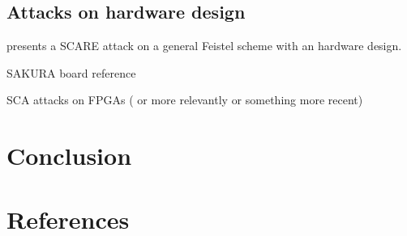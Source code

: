 \documentclass[11pt]{sdm}
\begin{document}
\subsection{Attacks on hardware design}

\cite{Réal_Dubois_Guilloux_Valette_Drissi_2008} presents a SCARE attack on a general Feistel scheme with an hardware design.

SAKURA board reference

SCA attacks on FPGAs (\cite{Peeters_Standaert_Donckers_Quisquater_2005} or more relevantly \cite{Standaert_Ors_Preneel_2004} or something more recent)

\section{Conclusion}

\section*{References}

\printbibliography
\end{document}
